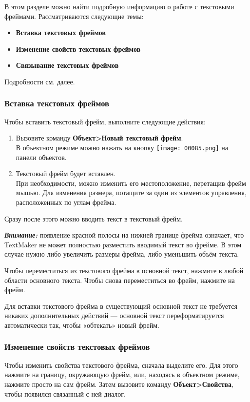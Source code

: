 ﻿\documentclass[a4paper,10pt]{article}
\begin{document}
В этом разделе можно найти подробную информацию о работе с текстовыми фреймами. Рассматриваются следующие темы:

\begin{itemize}
 \item \textbf{Вставка текстовых фреймов}
 \item \textbf{Изменение свойств текстовых фреймов}
 \item \textbf{Связывание текстовых фреймов}
\end{itemize}

Подробности см. далее.

\subsubsection{Вставка текстовых фреймов}
Чтобы вставить текстовый фрейм, выполните следующие действия:

\begin{enumerate}
 \item Вызовите команду \textbf{Объект>Новый текстовый фрейм}.\\
 В объектном режиме можно нажать на кнопку \texttt{[image: 00085.png]} на панели объектов.
 \item Текстовый фрейм будет вставлен.\\
 При необходимости, можно изменить его местоположение, перетащив фрейм мышью. Для изменения размера, потащите за один из элементов управления, расположенных по углам фрейма.
\end{enumerate}

Сразу после этого можно вводить текст в текстовый фрейм.

\begin{mdframed}[backgroundcolor=blue!10]
\textbf{\textit{Внимание:}} появление красной полосы на нижней границе фрейма означает, что TextMaker не может полностью разместить вводимый текст во фрейме. В этом случае нужно либо увеличить размеры фрейма, либо уменьшить объём текста.
\end{mdframed}

Чтобы переместиться из текстового фрейма в основной текст, нажмите в любой области основного текста. Чтобы снова переместиться во фрейм, нажмите на фрейм.

Для вставки текстового фрейма в существующий основной текст не требуется никаких дополнительных действий — основной текст переформатируется автоматически так, чтобы «обтекать» новый фрейм.

\subsubsection{Изменение свойств текстовых фреймов}
Чтобы изменить свойства текстового фрейма, сначала выделите его. Для этого нажмите на границу, окружающую фрейм, или, находясь в объектном режиме, нажмите просто на сам фрейм. Затем вызовите команду \textbf{Объект>Свойства}, чтобы появился связанный с ней диалог.
\end{document}
